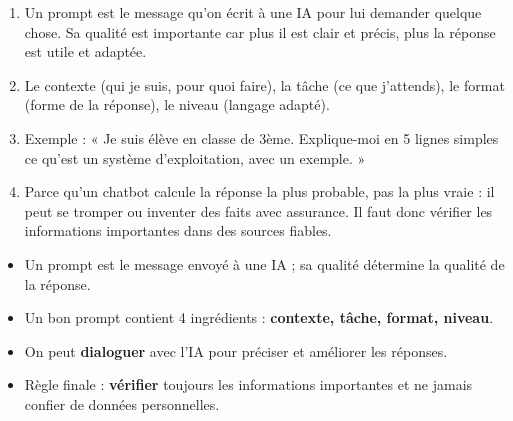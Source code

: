 \documentclass[11pt]{article}
\newcommand{\cle}[1]{{\popxbold\color{popdark}#1}}
\begin{document}
\begin{corrige}
\begin{enumerate}
\item Un prompt est le message qu'on écrit à une IA pour lui demander quelque chose. Sa qualité est importante car plus il est clair et précis, plus la réponse est utile et adaptée.
\item Le contexte (qui je suis, pour quoi faire), la tâche (ce que j'attends), le format (forme de la réponse), le niveau (langage adapté).
\item Exemple : « Je suis élève en classe de 3ème. Explique-moi en 5 lignes simples ce qu'est un système d'exploitation, avec un exemple. »
\item Parce qu'un chatbot calcule la réponse la plus probable, pas la plus vraie : il peut se tromper ou inventer des faits avec assurance. Il faut donc vérifier les informations importantes dans des sources fiables.
\end{enumerate}
\end{corrige}

\begin{aretenir}
\begin{itemize}
\item Un \cle{prompt} est le message envoyé à une IA ; sa qualité détermine la qualité de la réponse.
\item Un bon prompt contient 4 ingrédients : \textbf{contexte, tâche, format, niveau}.
\item On peut \textbf{dialoguer} avec l'IA pour préciser et améliorer les réponses.
\item Règle finale : \textbf{vérifier} toujours les informations importantes et ne jamais confier de données personnelles.
\end{itemize}
\end{aretenir}
\end{document}
